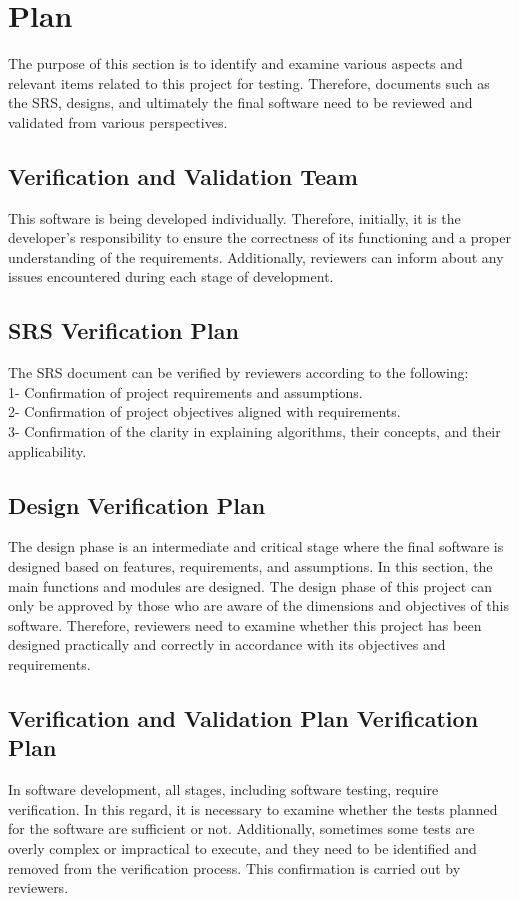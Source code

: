 \documentclass[12pt, titlepage]{article}
\begin{document}
\citet{SRS}

\section{Plan}
The purpose of this section is to identify and examine various aspects and relevant items related to this project for testing. Therefore, documents such as the SRS, designs, and ultimately the final software need to be reviewed and validated from various perspectives.

\subsection{Verification and Validation Team}

This software is being developed individually. Therefore, initially, it is the developer's responsibility to ensure the correctness of its functioning and a proper understanding of the requirements. Additionally, reviewers can inform about any issues encountered during each stage of development.

\subsection{SRS Verification Plan}

The SRS document can be verified by reviewers according to the following:\\
1- Confirmation of project requirements and assumptions.\\
2- Confirmation of project objectives aligned with requirements.\\
3- Confirmation of the clarity in explaining algorithms, their concepts, and their applicability.

\subsection{Design Verification Plan}
The design phase is an intermediate and critical stage where the final software is designed based on features, requirements, and assumptions. In this section, the main functions and modules are designed.
The design phase of this project can only be approved by those who are aware of the dimensions and objectives of this software. Therefore, reviewers need to examine whether this project has been designed practically and correctly in accordance with its objectives and requirements.

\subsection{Verification and Validation Plan Verification Plan}
In software development, all stages, including software testing, require verification. In this regard, it is necessary to examine whether the tests planned for the software are sufficient or not. Additionally, sometimes some tests are overly complex or impractical to execute, and they need to be identified and removed from the verification process. This confirmation is carried out by reviewers.
\end{document}
